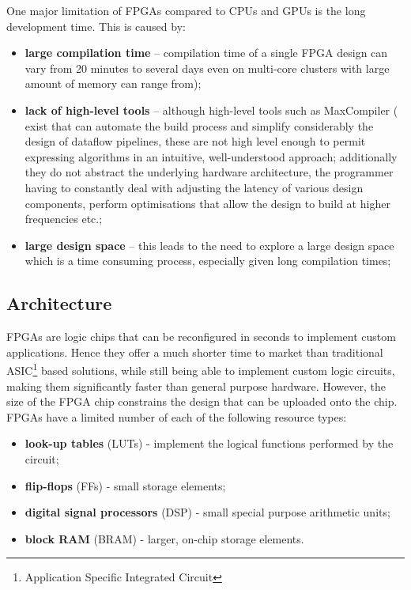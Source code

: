 One major limitation of FPGAs compared to CPUs and GPUs is the long
development time. This is caused by:
\begin{itemize}
\item \textbf{large compilation time} -- compilation time of a single FPGA
  design can vary from 20 minutes to several days even on multi-core
  clusters with large amount of memory can range from);
\item \textbf{lack of high-level tools} -- although high-level tools such
  as MaxCompiler ( exist that can automate
  the build process and simplify considerably the design of dataflow
  pipelines, these are not high level enough to permit expressing
  algorithms in an intuitive, well-understood approach; additionally
  they do not abstract the underlying hardware architecture, the
  programmer having to constantly deal with adjusting the latency of
  various design components, perform optimisations that allow the
  design to build at higher frequencies etc.;
\item \textbf{large design space} -- this leads to the need to explore a
  large design space which is a time consuming process, especially
  given long compilation times;
\end{itemize}

\subsection{Architecture}

FPGAs are logic chips that can be reconfigured in seconds to implement
custom applications. Hence they offer a much shorter time to market
than traditional ASIC\footnote{Application Specific Integrated
  Circuit} based solutions, while still being able to implement custom
logic circuits, making them significantly faster than general purpose
hardware. However, the size of the FPGA chip constrains the design
that can be uploaded onto the chip. FPGAs have a limited number of
each of the following resource types:

\begin{itemize}
\item \textbf{look-up tables} (LUTs) - implement the logical functions performed by the circuit;
\item \textbf{flip-flops} (FFs) - small storage elements;
\item \textbf{digital signal processors} (DSP) - small special purpose arithmetic units;
\item \textbf{block RAM} (BRAM) - larger, on-chip storage elements.
\end{itemize}

